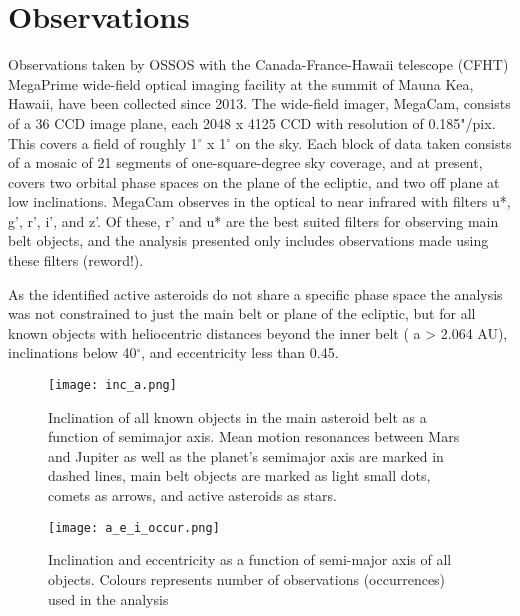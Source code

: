 \documentclass[iop,apj]{emulateapj}
\begin{document}
\section{Observations}

Observations taken by OSSOS with the Canada-France-Hawaii telescope (CFHT) MegaPrime wide-field optical imaging facility  at the summit of Mauna Kea, Hawaii, have been collected since 2013. The wide-field imager, MegaCam, consists of a 36 CCD image plane, each 2048 x 4125 CCD with resolution of 0.185"/pix. This covers a field of  roughly 1$^{\circ}$ x 1$^{\circ}$ on the sky. Each block of data taken consists of a mosaic of 21 segments of one-square-degree sky coverage, and at present, covers two orbital phase spaces on the plane of the ecliptic, and two off plane at low inclinations. MegaCam observes in the optical to near infrared with filters u*, g', r', i', and z'. Of these, r' and u* are the best suited filters for observing main belt objects, and the analysis presented only includes observations made using these filters (reword!). 




As the identified active asteroids do not share a specific phase space the analysis was not constrained to just the main belt or plane of the ecliptic, but for all known objects with heliocentric distances beyond the inner belt ( a > 2.064 AU), inclinations below 40$^{\circ}$, and eccentricity less than 0.45. 









\begin{figure}[!htb]
    \centering
    \texttt{[image: inc\_a.png]}
    \caption{Inclination of all known objects in the main asteroid belt as a function of semimajor axis.  Mean motion resonances between Mars and Jupiter as well as the planet's semimajor axis are marked in dashed lines, main belt objects are marked as light small dots, comets as arrows, and active asteroids as stars. \cite{mpc}}\label{fig:1}
\end{figure}

\begin{figure}[!htb]
    \centering
    \texttt{[image: a\_e\_i\_occur.png]}
    \caption{Inclination and eccentricity as a function of semi-major axis of all objects. Colours represents number of observations (occurrences) used in the analysis}\label{fig:2}
\end{figure}
\end{document}
